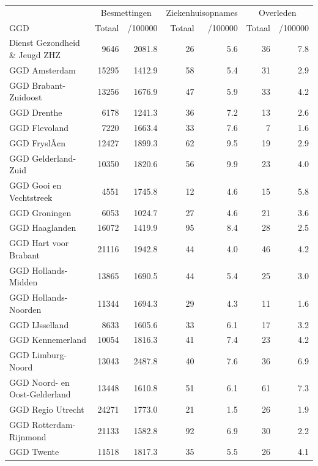 \documentclass[
  english,
  man,floatsintext]{apa6}
\begin{document}
\begin{table}
\centering\begingroup\fontsize{10}{12}\selectfont

\begin{threeparttable}
\begin{tabular}{lrrrrrr}
\toprule
\multicolumn{1}{c}{ } & \multicolumn{2}{c}{Besmettingen} & \multicolumn{2}{c}{Ziekenhuisopnames} & \multicolumn{2}{c}{Overleden} \\
\cmidrule(l{3pt}r{3pt}){2-3} \cmidrule(l{3pt}r{3pt}){4-5} \cmidrule(l{3pt}r{3pt}){6-7}
GGD & Totaal & /100000 & Totaal & /100000 & Totaal & /100000\\
\midrule
Dienst Gezondheid \& Jeugd ZHZ & 9646 & 2081.8 & 26 & 5.6 & 36 & 7.8\\
GGD Amsterdam & 15295 & 1412.9 & 58 & 5.4 & 31 & 2.9\\
GGD Brabant-Zuidoost & 13256 & 1676.9 & 47 & 5.9 & 33 & 4.2\\
GGD Drenthe & 6178 & 1241.3 & 36 & 7.2 & 13 & 2.6\\
GGD Flevoland & 7220 & 1663.4 & 33 & 7.6 & 7 & 1.6\\
GGD FryslÃ¢n & 12427 & 1899.3 & 62 & 9.5 & 19 & 2.9\\
GGD Gelderland-Zuid & 10350 & 1820.6 & 56 & 9.9 & 23 & 4.0\\
GGD Gooi en Vechtstreek & 4551 & 1745.8 & 12 & 4.6 & 15 & 5.8\\
GGD Groningen & 6053 & 1024.7 & 27 & 4.6 & 21 & 3.6\\
GGD Haaglanden & 16072 & 1419.9 & 95 & 8.4 & 28 & 2.5\\
GGD Hart voor Brabant & 21116 & 1942.8 & 44 & 4.0 & 46 & 4.2\\
GGD Hollands-Midden & 13865 & 1690.5 & 44 & 5.4 & 25 & 3.0\\
GGD Hollands-Noorden & 11344 & 1694.3 & 29 & 4.3 & 11 & 1.6\\
GGD IJsselland & 8633 & 1605.6 & 33 & 6.1 & 17 & 3.2\\
GGD Kennemerland & 10054 & 1816.3 & 41 & 7.4 & 23 & 4.2\\
GGD Limburg-Noord & 13043 & 2487.8 & 40 & 7.6 & 36 & 6.9\\
GGD Noord- en Oost-Gelderland & 13448 & 1610.8 & 51 & 6.1 & 61 & 7.3\\
GGD Regio Utrecht & 24271 & 1773.0 & 21 & 1.5 & 26 & 1.9\\
GGD Rotterdam-Rijnmond & 21133 & 1582.8 & 92 & 6.9 & 30 & 2.2\\
GGD Twente & 11518 & 1817.3 & 35 & 5.5 & 26 & 4.1\\

\end{tabular}
\end{threeparttable}
\end{table}
\end{document}
